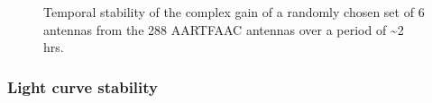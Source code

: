 \documentclass{aa}
\begin{document}
\begin{figure}[tbh]
\caption{\label{fig:gain-Temporal-stability}Temporal stability of the complex
gain of a randomly chosen set of 6 antennas from the 288 AARTFAAC
antennas over a period of \textasciitilde2 hrs.}
\end{figure}

\subsubsection{Light curve stability}
\end{document}
